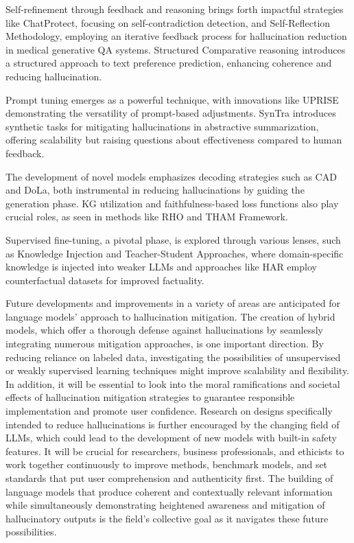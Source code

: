 \documentclass[11pt]{article}
\begin{document}
Self-refinement through feedback and reasoning brings forth impactful strategies like ChatProtect, focusing on self-contradiction detection, and Self-Reflection Methodology, employing an iterative feedback process for hallucination reduction in medical generative QA systems. Structured Comparative reasoning introduces a structured approach to text preference prediction, enhancing coherence and reducing hallucination.

Prompt tuning emerges as a powerful technique, with innovations like UPRISE demonstrating the versatility of prompt-based adjustments. SynTra introduces synthetic tasks for mitigating hallucinations in abstractive summarization, offering scalability but raising questions about effectiveness compared to human feedback.

The development of novel models emphasizes decoding strategies such as CAD and DoLa, both instrumental in reducing hallucinations by guiding the generation phase. KG utilization and faithfulness-based loss functions also play crucial roles, as seen in methods like RHO and THAM Framework.

Supervised fine-tuning, a pivotal phase, is explored through various lenses, such as Knowledge Injection and Teacher-Student Approaches, where domain-specific knowledge is injected into weaker LLMs and approaches like HAR employ counterfactual datasets for improved factuality.

Future developments and improvements in a variety of areas are anticipated for language models' approach to hallucination mitigation. The creation of hybrid models, which offer a thorough defense against hallucinations by seamlessly integrating numerous mitigation approaches, is one important direction. By reducing reliance on labeled data, investigating the possibilities of unsupervised or weakly supervised learning techniques might improve scalability and flexibility. In addition, it will be essential to look into the moral ramifications and societal effects of hallucination mitigation strategies to guarantee responsible implementation and promote user confidence. Research on designs specifically intended to reduce hallucinations is further encouraged by the changing field of LLMs, which could lead to the development of new models with built-in safety features. It will be crucial for researchers, business professionals, and ethicists to work together continuously to improve methods, benchmark models, and set standards that put user comprehension and authenticity first. The building of language models that produce coherent and contextually relevant information while simultaneously demonstrating heightened awareness and mitigation of hallucinatory outputs is the field's collective goal as it navigates these future possibilities.
\end{document}
